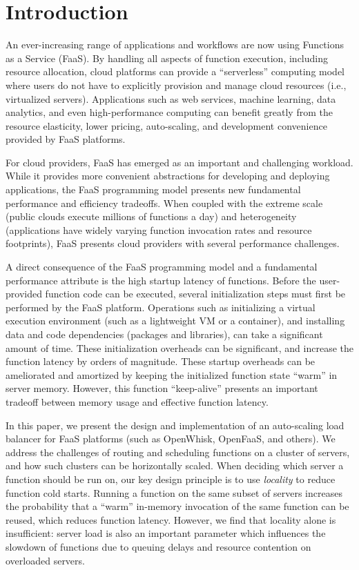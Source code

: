 \section{Introduction}
An ever-increasing range of applications and workflows are now using  Functions as a Service (FaaS).
By handling all aspects of function execution, including resource allocation, cloud platforms can provide a ``serverless'' computing model where users do not have to explicitly provision and manage cloud resources (i.e., virtualized servers). 
Applications such as web services, machine learning, data analytics, and even high-performance computing can benefit greatly from the resource elasticity, lower pricing, auto-scaling, and development convenience provided by FaaS platforms. 

For cloud providers, FaaS has emerged as an important and challenging workload. 
While it provides more convenient abstractions for developing and deploying applications, the FaaS programming model presents new fundamental performance and efficiency tradeoffs.
When coupled with the extreme scale (public clouds execute millions of functions a day) and heterogeneity (applications have widely varying function invocation rates and resource footprints), FaaS presents cloud providers with several performance challenges. 

A direct consequence of the FaaS programming model and a fundamental performance attribute is the high startup latency of functions. 
Before the user-provided function code can be executed, several initialization steps must first be performed by the FaaS platform. 
Operations such as initializing a virtual execution environment (such as a lightweight VM or a container), and installing data and code dependencies (packages and libraries), can take a significant amount of time. %
These initialization overheads can be significant, and increase the function latency by orders of magnitude. 
These startup overheads can be ameliorated and amortized by keeping the initialized function state ``warm'' in server memory.
However, this function ``keep-alive'' presents an important tradeoff between memory usage and effective function latency. 


In this paper, we present the design and implementation of an auto-scaling load balancer for FaaS platforms (such as OpenWhisk, OpenFaaS, and others).
We address the challenges of routing and scheduling functions on a cluster of servers, and how such clusters can be horizontally scaled. 
When deciding which server a function should be run on, our key design principle is to use \emph{locality} to reduce function cold starts.
Running a function on the same subset of servers increases the probability that a ``warm'' in-memory invocation of the same function can be reused, which reduces function latency. 
However, we find that locality alone is insufficient: server load is also an important parameter which influences the slowdown of functions due to queuing delays and resource contention on overloaded servers. 

